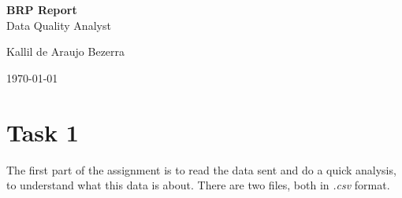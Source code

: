 \documentclass[a4paper, 12pt]{article}
\begin{document}

\begin{titlepage}
	\begin{center}
	

		\textbf{\Large{BRP Report}}\\
		\large{Data Quality Analyst}\\ 
		\vspace{15pt}
        \vspace{95pt}
		\vspace{3,5cm}
	\end{center}
	
	\begin{flushleft}
		\begin{tabbing}
			Kallil de Araujo Bezerra \\
	\end{tabbing}
 \end{flushleft}
	\vspace{1cm}
	
	\begin{center}
		\vspace{\fill}
			\today
	\end{center}
\end{titlepage}


\newpage
\tableofcontents
\thispagestyle{empty}

\newpage
{}
\section{Task 1}

The first part of the assignment is to read the data sent and do a quick analysis, to understand what this data is about. There are two files, both in \textit{.csv} format.
\end{document}
